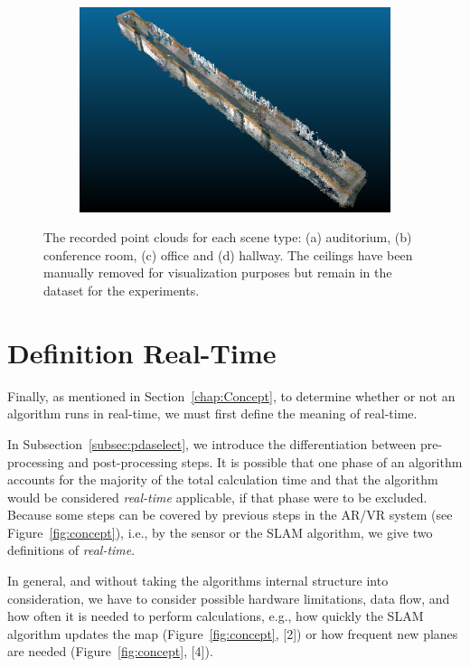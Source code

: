\documentclass[main.tex]{subfiles}
\begin{document}
\begin{figure}[H]
\begin{subfigure}{0.5\textwidth}
        \caption[Dynamic Dataset office]{}
        \label{fig:fin425}
    \end{subfigure}
    \begin{subfigure}{0.5\textwidth}
        \centering
        \includegraphics[width=0.9\linewidth]{images/hallway.png}
        \caption[Dynamic Dataset office]{}
        \label{fig:finhw}
    \end{subfigure}
    \caption[Dynamic Datasets]{The recorded point clouds for each scene type: (a) auditorium, (b) conference room, (c) office and (d) hallway.
        The ceilings have been manually removed for visualization purposes but remain in the dataset for the experiments.}
    \label{fig:fin}
\end{figure}


\section{Definition Real-Time}\label{sec:realtime}
Finally, as mentioned in Section~\ref{chap:Concept}, to determine whether or not an algorithm runs in real-time, we must first define the meaning of real-time.


In Subsection~\ref{subsec:pdaselect}, we introduce the differentiation between pre-processing and post-processing steps.
It is possible that one phase of an algorithm accounts for the majority of the total calculation time and that the algorithm
would be considered \textit{real-time} applicable, if that phase were to be excluded.
Because some steps can be covered by previous steps in the AR/VR system (see Figure~\ref{fig:concept}), i.e., by the sensor or the SLAM algorithm,
we give two definitions of \textit{real-time}.

In general, and without taking the algorithms internal structure into consideration, we have to consider possible
hardware limitations, data flow, and how often it is needed to perform calculations, e.g., how quickly the SLAM algorithm
updates the map (Figure~\ref{fig:concept}, [2]) or how frequent new planes are needed (Figure~\ref{fig:concept}, [4]).
\end{document}
